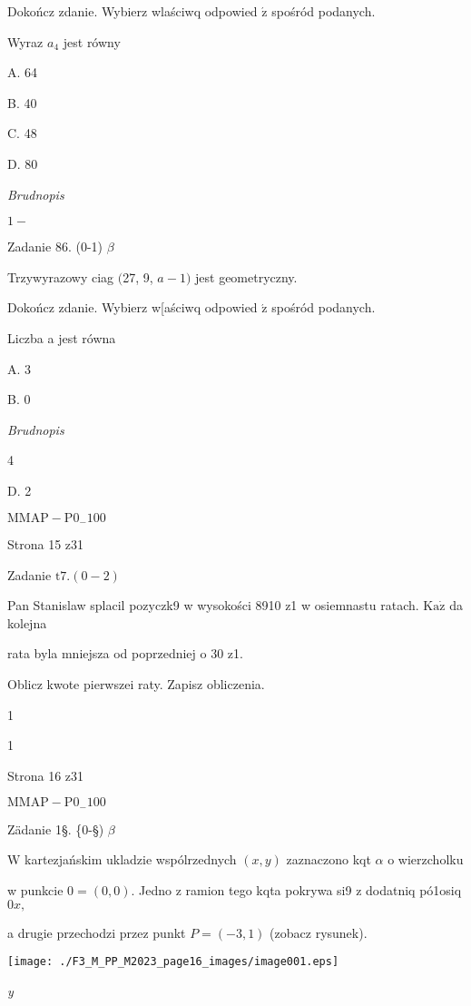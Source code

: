 \documentclass[a4paper,12pt]{article}
\begin{document}
Dokończ zdanie. Wybierz wlaściwq odpowied $\acute{\mathrm{z}}$ spośród podanych.

Wyraz $a_{4}$ jest równy

A. 64

B. 40

C. 48

D. 80

{\it Brudnopis}

$1 -$

Zadanie 86. (0-1) $\beta$

Trzywyrazowy ciag $($27, 9, $a-1)$ jest geometryczny.

Dokończ zdanie. Wybierz w[aściwq odpowied $\acute{\mathrm{z}}$ spośród podanych.

Liczba a jest równa

A. 3

B. 0

{\it Brudnopis}

4

D. 2

$\mathrm{M}\mathrm{M}\mathrm{A}\mathrm{P}-\mathrm{P}0_{-}100$

Strona 15 z31





Zadanie $\mathrm{t}7. (0-2)$

Pan Stanislaw splacil pozyczk9 w wysokości 8910 z1 w osiemnastu ratach. $\mathrm{K}\mathrm{a}\dot{\mathrm{z}}$ da kolejna

rata byla mniejsza od poprzedniej o 30 z1.

Oblicz kwote pierwszei raty. Zapisz obliczenia.

1

1

Strona 16 z31

$\mathrm{M}\mathrm{M}\mathrm{A}\mathrm{P}-\mathrm{P}0_{-}100$





Zädanie 1\S. \{0-\S) $\beta$

$\mathrm{W}$ kartezjańskim ukladzie wspólrzednych $(x,y)$ zaznaczono kqt $\alpha$ o wierzcholku

w punkcie $0=(0,0)$. Jedno z ramion tego kqta pokrywa si9 z dodatniq pó1osiq $0x,$

a drugie przechodzi przez punkt $P=(-3,1)$ (zobacz rysunek).
\begin{center}
\texttt{[image: ./F3\_M\_PP\_M2023\_page16\_images/image001.eps]}
\end{center}
{\it y}
\end{document}
